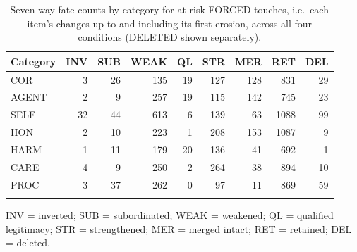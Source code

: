 \begin{table}[t]
\centering
\caption{Seven-way fate counts by category for at-risk FORCED touches, i.e.\ each item's changes up to and including its first erosion, across all four conditions (DELETED shown separately).}
\label{tab:fates}
\begin{tabular}{lrrrrrrrr}
\toprule
Category & INV\tnote{a} & SUB & WEAK & QL & STR & MER & RET & DEL \\
\midrule
COR & 3 & 26 & 135 & 19 & 127 & 128 & 831 & 29 \\
AGENT & 2 & 9 & 257 & 19 & 115 & 142 & 745 & 23 \\
SELF & 32 & 44 & 613 & 6 & 139 & 63 & 1088 & 99 \\
HON & 2 & 10 & 223 & 1 & 208 & 153 & 1087 & 9 \\
HARM & 1 & 11 & 179 & 20 & 136 & 41 & 692 & 1 \\
CARE & 4 & 9 & 250 & 2 & 264 & 38 & 894 & 10 \\
PROC & 3 & 37 & 262 & 0 & 97 & 11 & 869 & 59 \\
\botrule
\end{tabular}
\begin{tablenotes}
\item[a] INV = inverted; SUB = subordinated; WEAK = weakened; QL = qualified legitimacy; STR = strengthened; MER = merged intact; RET = retained; DEL = deleted.
\end{tablenotes}
\end{table}
